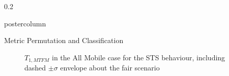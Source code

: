 \documentclass[final,hyperref={pdfpagelabels=false}]{beamer}
\def\colwidth{0.2\linewidth}
\begin{document}
\begin{frame}[fragile]
\begin{columns}[T]
\begin{column}{\colwidth}
\begin{beamercolorbox}[center,wd=\textwidth]{postercolumn}
\begin{minipage}[T]{.98\textwidth}
{\begin{block}{Metric Permutation and Classification}
\begin{figure}[h]
								\caption{$T_{1,MTFM}$ in the All Mobile case for the STS behaviour, including dashed $\pm\sigma$ envelope about the fair scenario}
								\label{fig:all_mobile_selfish}
							\end{figure}
							

\end{block}}
\end{minipage}
\end{beamercolorbox}
\end{column}
\end{columns}
\end{frame}
\end{document}
